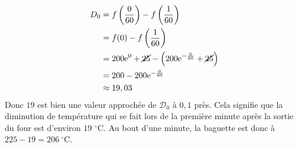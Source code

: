 \documentclass[10pt]{article}
\providecommand{\e}{{\mathrm{e}}}
\begin{document}
\begin{enumerate}
\begin{enumerate}
\begin{align*}
{D}_0 &= f\left(\dfrac{0}{60}\right)- f\left(\dfrac{1}{60}\right) \\
&= f(0) - f\left(\dfrac{1}{60}\right) \\
&= 200\e^0 + \cancel{25} - \left(200\e^{-\frac{6}{60}} + \cancel{25}\right) \\
&= 200 - 200\e^{-\frac{6}{60}} \\
&\approx 19,03
\end{align*}
Donc $19$ est bien une valeur approchée de $\mathcal{D}_0$ à $0,1$ près. Cela signifie que la diminution de température qui se fait lors de la première minute après la sortie du four est d'environ $19$ $^{\circ}$C. Au bout d'une minute, la baguette est donc à $225-19 = 206 \ ^{\circ}$C.
		







\end{enumerate}
\end{enumerate}
\end{document}

